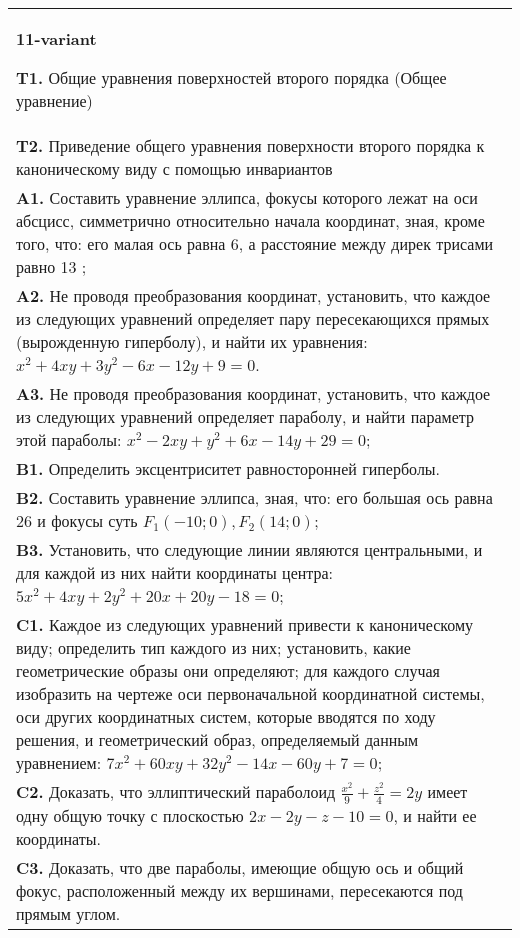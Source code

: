 \documentclass{article}
\begin{document}
\begin{tabular}{m{17cm}}
\textbf{11-variant}
\newline

\textbf{T1.} Общие уравнения поверхностей второго порядка (Общее уравнение) \\
\textbf{T2.} Приведение общего уравнения поверхности второго порядка к каноническому виду с помощью инвариантов \\
\textbf{A1.} Составить уравнение эллипса, фокусы которого лежат на оси абсцисс, симметрично относительно начала координат, зная, кроме того, что: его малая ось равна 6, а расстояние между дирек трисами равно 13 ; \\
\textbf{A2.} Не проводя преобразования координат, установить, что каждое из следующих уравнений определяет пару пересекающихся прямых (вырожденную гиперболу), и найти их уравнения: $x^2+4 x y+3 y^2-6 x-12 y+9=0$. \\
\textbf{A3.} Не проводя преобразования координат, установить, что каждое из следующих уравнений определяет параболу, и найти параметр этой параболы: $x^2-2 x y+y^2+6 x-14 y+29=0$; \\
\textbf{B1.} Определить эксцентриситет равносторонней гиперболы. \\
\textbf{B2.} Составить уравнение эллипса, зная, что: его большая ось равна 26 и фокусы суть $F_1(-10 ; 0), F_2(14 ; 0)$; \\
\textbf{B3.} Установить, что следующие линии являются центральными, и для каждой из них найти координаты центра: $5 x^2+4 x y+2 y^2+20 x+20 y-18=0$; \\
\textbf{C1.} Каждое из следующих уравнений привести к каноническому виду; определить тип каждого из них; установить, какие геометрические образы они определяют; для каждого случая изобразить на чертеже оси первоначальной координатной системы, оси других координатных систем, которые вводятся по ходу решения, и геометрический образ, определяемый данным уравнением: $7 x^2+60 x y+32 y^2-14 x-60 y+7=0$; \\
\textbf{C2.} Доказать, что эллиптический параболоид $\frac{x^2}{9}+\frac{z^2}{4}=2 y$ имеет одну общую точку с плоскостью $2 x-2 y-z-10=0$, и найти ее координаты. \\
\textbf{C3.} Доказать, что две параболы, имеющие общую ось и общий фокус, расположенный между их вершинами, пересекаются под прямым углом. \\

\end{tabular}
\vspace{1cm}
\end{document}
